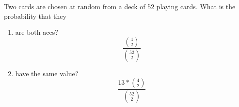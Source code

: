 \item Two cards are chosen at random from a deck of 52 playing cards. What is the probability that they
\begin{enumerate}
    \item are both aces?
    \[ \frac{\binom{4}{2}}{\binom{52}{2}} \]
    \item have the same value?
    \[ \frac{13 * \binom{4}{2}}{\binom{52}{2}} \]
\end{enumerate}